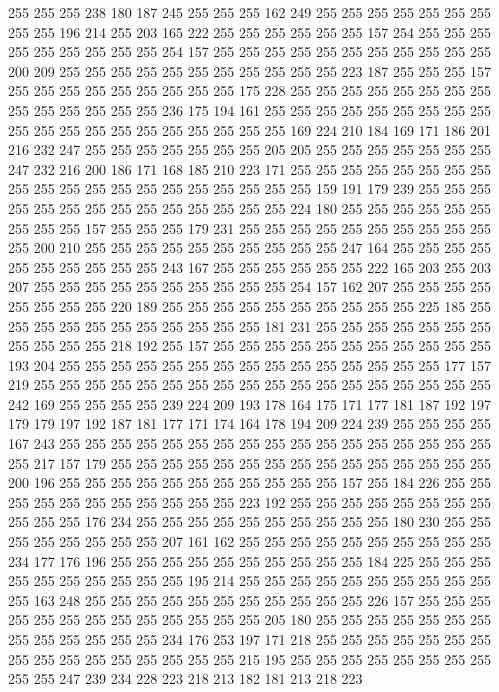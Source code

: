 255 255 255 238 180 187 245 255 255 255 162 249 255 255 255 255 255 255 255 255
255 196 214 255 203 165 222 255 255 255 255 255 255 157 254 255 255 255 255 255
255 255 255 255 254 157 255 255 255 255 255 255 255 255 255 255 255 200 209 255
255 255 255 255 255 255 255 255 255 255 223 187 255 255 255 157 255 255 255 255
255 255 255 255 255 175 228 255 255 255 255 255 255 255 255 255 255 255 255 255
255 236 175 194 161 255 255 255 255 255 255 255 255 255 255 255 255 255 255 255
255 255 255 255 255 169 224 210 184 169 171 186 201 216 232 247 255 255 255 255
255 255 255 205 205 255 255 255 255 255 255 255 247 232 216 200 186 171 168 185
210 223 171 255 255 255 255 255 255 255 255 255 255 255 255 255 255 255 255 255
255 255 255 159 191 179 239 255 255 255 255 255 255 255 255 255 255 255 255 255
255 224 180 255 255 255 255 255 255 255 255 255 157 255 255 255 179 231 255 255
255 255 255 255 255 255 255 255 255 200 210 255 255 255 255 255 255 255 255 255
255 247 164 255 255 255 255 255 255 255 255 255 255 243 167 255 255 255 255 255
255 222 165 203 255 203 207 255 255 255 255 255 255 255 255 255 255 254 157 162
207 255 255 255 255 255 255 255 255 220 189 255 255 255 255 255 255 255 255 255
255 225 185 255 255 255 255 255 255 255 255 255 255 255 181 231 255 255 255 255
255 255 255 255 255 255 255 218 192 255 157 255 255 255 255 255 255 255 255 255
255 255 193 204 255 255 255 255 255 255 255 255 255 255 255 255 255 255 255 177
157 219 255 255 255 255 255 255 255 255 255 255 255 255 255 255 255 255 255 255
242 169 255 255 255 255 239 224 209 193 178 164 175 171 177 181 187 192 197 179
179 197 192 187 181 177 171 174 164 178 194 209 224 239 255 255 255 255 167 243
255 255 255 255 255 255 255 255 255 255 255 255 255 255 255 255 255 255 217 157
179 255 255 255 255 255 255 255 255 255 255 255 255 255 255 255 200 196 255 255
255 255 255 255 255 255 255 255 255 157 255 184 226 255 255 255 255 255 255 255
255 255 255 255 223 192 255 255 255 255 255 255 255 255 255 255 255 176 234 255
255 255 255 255 255 255 255 255 255 180 230 255 255 255 255 255 255 255 255 207
161 162 255 255 255 255 255 255 255 255 255 255 234 177 176 196 255 255 255 255
255 255 255 255 255 255 184 225 255 255 255 255 255 255 255 255 255 255 195 214
255 255 255 255 255 255 255 255 255 255 255 163 248 255 255 255 255 255 255 255
255 255 255 255 226 157 255 255 255 255 255 255 255 255 255 255 255 255 255 205
180 255 255 255 255 255 255 255 255 255 255 255 255 255 234 176 253 197 171 218
255 255 255 255 255 255 255 255 255 255 255 255 255 255 255 255 215 195 255 255
255 255 255 255 255 255 255 255 247 239 234 228 223 218 213 182 181 213 218 223
